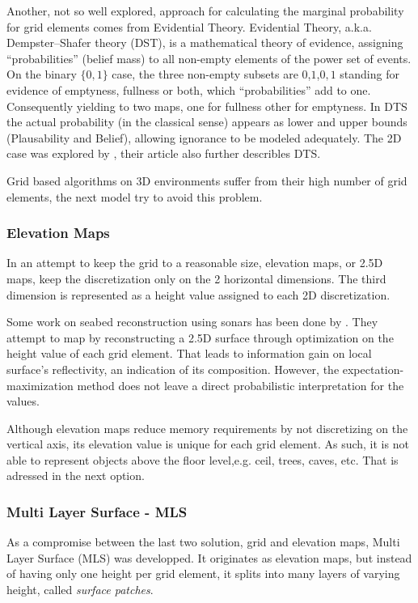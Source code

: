 Another, not so well explored, approach for calculating the marginal probability
for grid elements comes from Evidential Theory. Evidential Theory, a.k.a.
Dempster–Shafer theory (DST), is a mathematical theory of evidence, assigning
``probabilities'' (belief mass) to all non-empty elements of the power set of
events. On the binary $\{0,1\}$ case, the three non-empty subsets are
${0}$,${1}$,${0,1}$ standing for evidence of emptyness, fullness or both, which
``probabilities'' add to one.
Consequently yielding to two maps, one for fullness other for emptyness. In DTS
the actual probability (in the classical sense) appears as lower and upper
bounds (Plausability and Belief), allowing ignorance to be modeled adequately.
The 2D case was explored by \citet{Pagac1998}, their article also further
describles DTS.

Grid based algorithms on 3D environments suffer from their high number of grid
elements, the next model try to avoid this problem.

\subsubsection{Elevation Maps}

In an attempt to keep the grid to a reasonable size, elevation maps, or 2.5D
maps, keep the discretization only on the 2 horizontal dimensions. The third
dimension is represented as a height value assigned to each 2D discretization.

Some work on seabed reconstruction using sonars has been done by
\citet{Coiras2007,Coiras2009}. They attempt to map by reconstructing a
2.5D surface through optimization on the height value of each grid element. That
leads to information gain on local surface's reflectivity, an indication of its
composition. However, the expectation-maximization method does not leave a
direct probabilistic interpretation for the values.

Although elevation maps reduce memory requirements by not discretizing on
the vertical axis, its elevation value is unique for each grid element. As such,
it is not able to represent objects above the floor level,e.g. ceil, trees,
caves, etc. That is adressed in the next option.

\subsubsection{Multi Layer Surface - MLS}

As a compromise between the last two solution, grid and elevation maps, Multi
Layer Surface (MLS) was developped. It originates as elevation maps, but instead
of having only one height per grid element, it splits into many layers of
varying height, called \textit{surface patches}.

